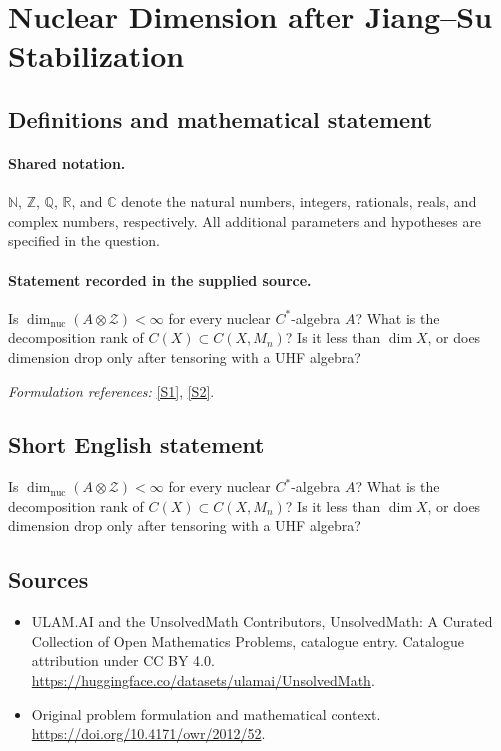 \documentclass[11pt]{article}
\newcommand{\sref}[2]{\hyperlink{source:#1:#2}{[S#2]}}
\begin{document}
\section{Nuclear Dimension after Jiang–Su Stabilization}\label{statement}

\subsection{Definitions and mathematical statement}

\paragraph{Shared notation.}$\mathbb N$, $\mathbb Z$, $\mathbb Q$, $\mathbb R$, and $\mathbb C$ denote the natural numbers, integers, rationals, reals, and complex numbers, respectively. All additional parameters and hypotheses are specified in the question.


\paragraph{Statement recorded in the supplied source.}
Is $\operatorname{dim}_{\mathrm{nuc}}(A\otimes\mathcal Z)<\infty$ for every nuclear $C^*$-algebra $A$? What is the decomposition rank of $C(X)\subset C(X,M_n)$? Is it less than $\dim X$, or does dimension drop only after tensoring with a UHF algebra?
\par\smallskip\textit{Formulation references:} \sref{statement}{1}, \sref{statement}{2}.
\subsection{Short English statement}
Is $\operatorname{dim}_{\mathrm{nuc}}(A\otimes\mathcal Z)<\infty$ for every nuclear $C^*$-algebra $A$? What is the decomposition rank of $C(X)\subset C(X,M_n)$? Is it less than $\dim X$, or does dimension drop only after tensoring with a UHF algebra?
\subsection{Sources}
\begin{itemize}
\item[\hypertarget{source:statement:1}{S1}] ULAM.AI and the UnsolvedMath Contributors, UnsolvedMath: A Curated Collection of Open Mathematics Problems, catalogue entry. Catalogue attribution under CC BY 4.0.
\url{https://huggingface.co/datasets/ulamai/UnsolvedMath}.
\item[\hypertarget{source:statement:2}{S2}] Original problem formulation and mathematical context.
\url{https://doi.org/10.4171/owr/2012/52}.
\end{itemize}
\label{end:statement}
\end{document}
